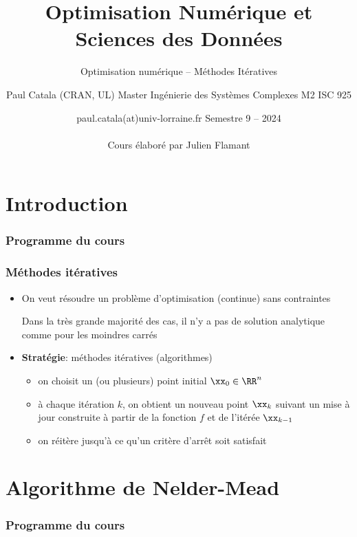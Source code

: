 \documentclass[9pt,table]{beamer} %
\title{Optimisation Numérique et Sciences des Données}
\subtitle{Optimisation numérique -- Méthodes Itératives}
\author{Paul Catala (CRAN, UL) \hfill Master Ingénierie des Systèmes Complexes M2 ISC 925}
\date{paul.catala(at)univ-lorraine.fr \hfill Semestre 9 -- 2024 \\ \\ Cours élaboré par Julien Flamant}
\begin{document}
\maketitle



\section{Introduction}

\begin{frame}
\frametitle{Programme du cours}
\tableofcontents[currentsection]
\end{frame}


\begin{frame}
\frametitle{Méthodes itératives}

\begin{itemize}[label=\tiny$\blacksquare$]
	\item On veut résoudre un problème d'optimisation (continue) sans contraintes
	
	Dans la très grande majorité des cas, il n'y a \alert{pas de solution analytique} comme pour les moindres carrés
	
	\pause
	
	\item \textbf{Stratégie}: \alert{méthodes itératives} (algorithmes)
	\begin{itemize}
		\item[1.] on \alert{choisit} un (ou plusieurs) point initial $\xx_0 \in \RR^n$
		\item[2.] à chaque itération $k$, on obtient un nouveau point $\xx_k$ suivant un mise à jour construite à partir de la fonction $f$ et de l'itérée $\xx_{k-1}$
		\item[3.] on réitère jusqu'à ce qu'un critère d'arrêt soit satisfait
	\end{itemize}
\end{itemize}

\end{frame}


\section{Algorithme de Nelder-Mead}
\begin{frame}
\frametitle{Programme du cours}
\tableofcontents[currentsection]
\end{frame}
\end{document}
